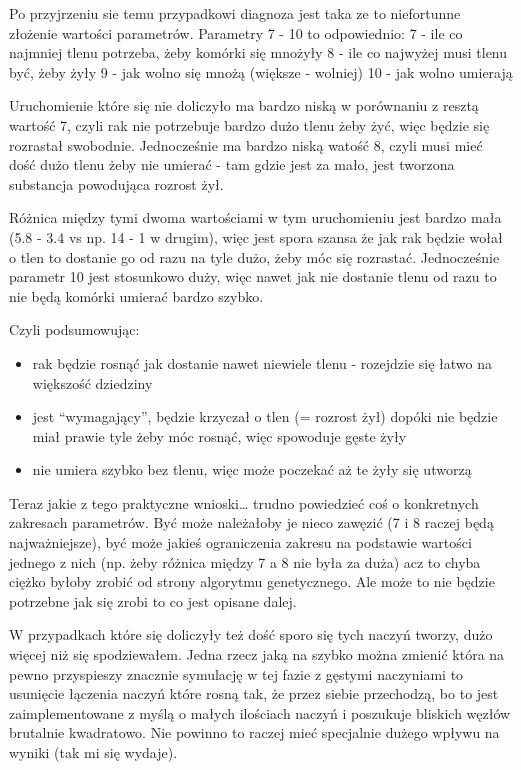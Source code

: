 \documentclass[]{article}
\providecommand{\tightlist}{%
  \setlength{\itemsep}{0pt}\setlength{\parskip}{0pt}}
\begin{document}
Po przyjrzeniu sie temu przypadkowi diagnoza jest taka ze to niefortunne
złożenie wartości parametrów. Parametry 7 - 10 to odpowiednio: 7 - ile
co najmniej tlenu potrzeba, żeby komórki się mnożyły 8 - ile co najwyżej
musi tlenu być, żeby żyły 9 - jak wolno się mnożą (większe - wolniej) 10
- jak wolno umierają

Uruchomienie które się nie doliczyło ma bardzo niską w porównaniu z
resztą wartość 7, czyli rak nie potrzebuje bardzo dużo tlenu żeby żyć,
więc będzie się rozrastał swobodnie. Jednocześnie ma bardzo niską watość
8, czyli musi mieć dość dużo tlenu żeby nie umierać - tam gdzie jest za
mało, jest tworzona substancja powodująca rozrost żył.

Różnica między tymi dwoma wartościami w tym uruchomieniu jest bardzo
mała (5.8 - 3.4 vs np. 14 - 1 w drugim), więc jest spora szansa że jak
rak będzie wołał o tlen to dostanie go od razu na tyle dużo, żeby móc
się rozrastać. Jednocześnie parametr 10 jest stosunkowo duży, więc nawet
jak nie dostanie tlenu od razu to nie będą komórki umierać bardzo
szybko.

Czyli podsumowując:

\begin{itemize}
\tightlist
\item
  rak będzie rosnąć jak dostanie nawet niewiele tlenu - rozejdzie się
  łatwo na większość dziedziny
\item
  jest ``wymagający'', będzie krzyczał o tlen (= rozrost żył) dopóki nie
  będzie miał prawie tyle żeby móc rosnąć, więc spowoduje gęste żyły
\item
  nie umiera szybko bez tlenu, więc może poczekać aż te żyły się utworzą
\end{itemize}

Teraz jakie z tego praktyczne wnioski\ldots{} trudno powiedzieć coś o
konkretnych zakresach parametrów. Być może należałoby je nieco zawęzić
(7 i 8 raczej będą najważniejsze), być może jakieś ograniczenia zakresu
na podstawie wartości jednego z nich (np. żeby różnica między 7 a 8 nie
była za duża) acz to chyba ciężko byłoby zrobić od strony algorytmu
genetycznego. Ale może to nie będzie potrzebne jak się zrobi to co jest
opisane dalej.

W przypadkach które się doliczyły też dość sporo się tych naczyń tworzy,
dużo więcej niż się spodziewałem. Jedna rzecz jaką na szybko można
zmienić która na pewno przyspieszy znacznie symulację w tej fazie z
gęstymi naczyniami to usunięcie łączenia naczyń które rosną tak, że
przez siebie przechodzą, bo to jest zaimplementowane z myślą o małych
ilościach naczyń i poszukuje bliskich węzłów brutalnie kwadratowo. Nie
powinno to raczej mieć specjalnie dużego wpływu na wyniki (tak mi się
wydaje).
\end{document}
